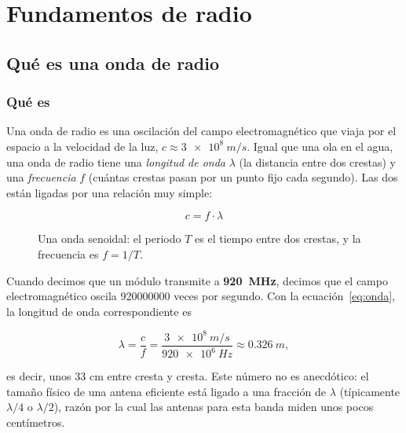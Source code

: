 \part{Fundamentos de radio}
\label{part:radio}

\chapter{Qué es una onda de radio}

\section{Qué es}

Una onda de radio es una oscilación del campo electromagnético que viaja por el espacio a la
velocidad de la luz, $c \approx \SI{3e8}{m/s}$. Igual que una ola en el agua, una onda de radio
tiene una \emph{longitud de onda} $\lambda$ (la distancia entre dos crestas) y una
\emph{frecuencia} $f$ (cuántas crestas pasan por un punto fijo cada segundo). Las dos están
ligadas por una relación muy simple:

\begin{equation}
  c = f \cdot \lambda
  \label{eq:onda}
\end{equation}

\begin{figure}[h]
  \centering
  \caption{Una onda senoidal: el periodo $T$ es el tiempo entre dos crestas, y la frecuencia
    es $f = 1/T$.}
  \label{fig:onda-seno}
\end{figure}

Cuando decimos que un módulo transmite a \textbf{\SI{920}{MHz}}, decimos que el campo
electromagnético oscila \num{920000000} veces por segundo. Con la ecuación~\eqref{eq:onda}, la
longitud de onda correspondiente es

\[
  \lambda = \frac{c}{f} = \frac{\SI{3e8}{m/s}}{\SI{920e6}{Hz}} \approx \SI{0.326}{m},
\]

es decir, unos 33 cm entre cresta y cresta. Este número no es anecdótico: el tamaño físico de
una antena eficiente está ligado a una fracción de $\lambda$ (típicamente $\lambda/4$ o
$\lambda/2$), razón por la cual las antenas para esta banda miden unos pocos centímetros.

